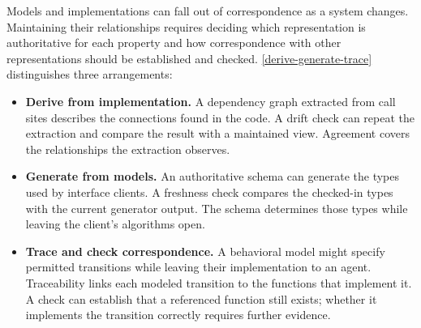 

Models and implementations can fall out of correspondence as a system changes. Maintaining their relationships requires deciding which representation is authoritative for each property and how correspondence with other representations should be established and checked. \autoref{derive-generate-trace} distinguishes three arrangements:







\begin{itemize}
\item \textbf{Derive from implementation.} A dependency graph extracted from call sites describes the connections found in the code. A drift check can repeat the extraction and compare the result with a maintained view. Agreement covers the relationships the extraction observes.
\item \textbf{Generate from models.} An authoritative schema can generate the types used by interface clients. A freshness check compares the checked-in types with the current generator output. The schema determines those types while leaving the client’s algorithms open.
\item \textbf{Trace and check correspondence.} A behavioral model might specify permitted transitions while leaving their implementation to an agent. Traceability links each modeled transition to the functions that implement it. A check can establish that a referenced function still exists; whether it implements the transition correctly requires further evidence.
\end{itemize}

